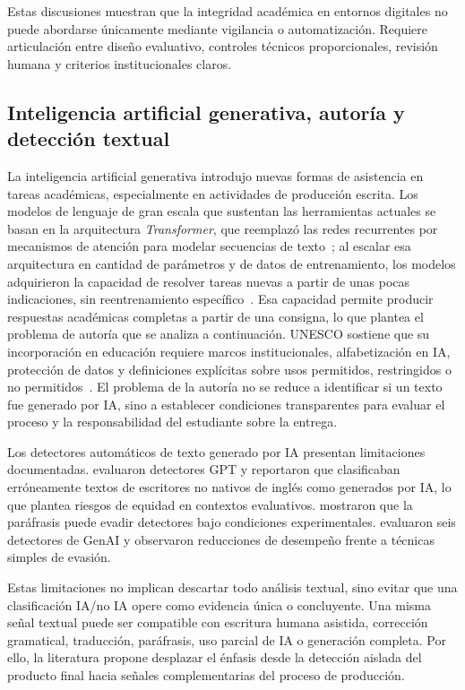 Estas discusiones muestran que la integridad académica en entornos digitales no puede abordarse únicamente mediante vigilancia o automatización. Requiere articulación entre diseño evaluativo, controles técnicos proporcionales, revisión humana y criterios institucionales claros.

\subsection{Inteligencia artificial generativa, autoría y detección textual}
\label{sec:ia_generativa}

La inteligencia artificial generativa introdujo nuevas formas de asistencia en tareas académicas, especialmente en actividades de producción escrita. Los modelos de lenguaje de gran escala que sustentan las herramientas actuales se basan en la arquitectura \textit{Transformer}, que reemplazó las redes recurrentes por mecanismos de atención para modelar secuencias de texto~\parencite{Vaswani2017}; al escalar esa arquitectura en cantidad de parámetros y de datos de entrenamiento, los modelos adquirieron la capacidad de resolver tareas nuevas a partir de unas pocas indicaciones, sin reentrenamiento específico~\parencite{Brown2020}. Esa capacidad permite producir respuestas académicas completas a partir de una consigna, lo que plantea el problema de autoría que se analiza a continuación. UNESCO sostiene que su incorporación en educación requiere marcos institucionales, alfabetización en IA, protección de datos y definiciones explícitas sobre usos permitidos, restringidos o no permitidos~\parencite{UNESCO2023}. El problema de la autoría no se reduce a identificar si un texto fue generado por IA, sino a establecer condiciones transparentes para evaluar el proceso y la responsabilidad del estudiante sobre la entrega.

Los detectores automáticos de texto generado por IA presentan limitaciones documentadas. \textcite{Liang2023} evaluaron detectores GPT y reportaron que clasificaban erróneamente textos de escritores no nativos de inglés como generados por IA, lo que plantea riesgos de equidad en contextos evaluativos. \textcite{Krishna2023} mostraron que la paráfrasis puede evadir detectores bajo condiciones experimentales. \textcite{Perkins2024} evaluaron seis detectores de GenAI y observaron reducciones de desempeño frente a técnicas simples de evasión.

Estas limitaciones no implican descartar todo análisis textual, sino evitar que una clasificación IA/no IA opere como evidencia única o concluyente. Una misma señal textual puede ser compatible con escritura humana asistida, corrección gramatical, traducción, paráfrasis, uso parcial de IA o generación completa. Por ello, la literatura propone desplazar el énfasis desde la detección aislada del producto final hacia señales complementarias del proceso de producción.

